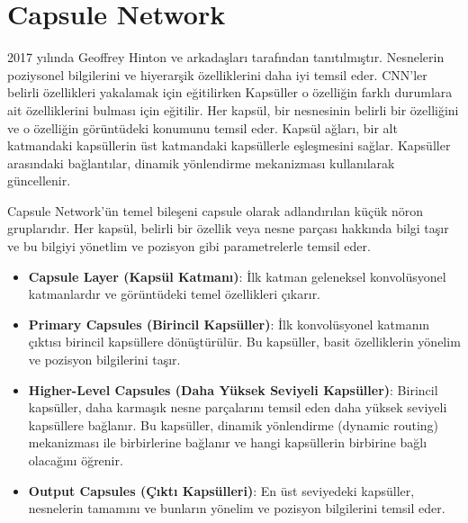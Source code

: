 \section{Capsule Network}
2017 yılında Geoffrey Hinton ve arkadaşları tarafından tanıtılmıştır. Nesnelerin poziysonel bilgilerini ve hiyerarşik özelliklerini daha iyi temsil eder. CNN'ler belirli özellikleri yakalamak için eğitilirken Kapsüller o özelliğin farklı durumlara ait özelliklerini bulması için eğitilir.   Her kapsül, bir nesnesinin belirli bir özelliğini ve o özelliğin görüntüdeki konumunu temsil eder. Kapsül ağları, bir alt katmandaki kapsüllerin üst katmandaki kapsüllerle eşleşmesini sağlar. Kapsüller arasındaki bağlantılar, dinamik yönlendirme mekanizması kullanılarak güncellenir. 

Capsule Network'ün temel bileşeni capsule olarak adlandırılan küçük nöron gruplarıdır. Her kapsül, belirli bir özellik veya nesne parçası hakkında bilgi taşır ve bu bilgiyi yönetlim ve pozisyon gibi parametrelerle temsil eder.

\begin{itemize}
	\item \textbf{Capsule Layer (Kapsül Katmanı)}: İlk katman geleneksel konvolüsyonel katmanlardır ve görüntüdeki temel özellikleri çıkarır.
	\item \textbf{Primary Capsules (Birincil Kapsüller)}: İlk konvolüsyonel katmanın çıktısı birincil kapsüllere dönüştürülür. Bu kapsüller, basit özelliklerin yönelim ve pozisyon bilgilerini taşır.
	\item \textbf{Higher-Level Capsules (Daha Yüksek Seviyeli Kapsüller)}: Birincil kapsüller, daha karmaşık nesne parçalarını temsil eden daha yüksek seviyeli kapsüllere bağlanır. Bu kapsüller, dinamik yönlendirme (dynamic routing) mekanizması ile birbirlerine bağlanır ve hangi kapsüllerin birbirine bağlı olacağını öğrenir.
	\item \textbf{Output Capsules (Çıktı Kapsülleri)}: En üst seviyedeki kapsüller, nesnelerin tamamını ve bunların yönelim ve pozisyon bilgilerini temsil eder.
\end{itemize}

